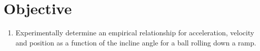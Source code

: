 
\section*{Objective}

\begin{enumerate}[label={\arabic*.}]
	\item{Experimentally determine an empirical relationship for acceleration, velocity and position as a function of the incline angle for a ball rolling down a ramp.}
\end{enumerate}

%
%
%
